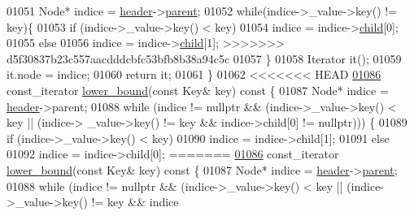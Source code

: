 \begin{DoxyCode}
01051             Node* indice = \hyperlink{classaed2_1_1map_a92d93f905c8ad73fba18fdc7e8915cce_a92d93f905c8ad73fba18fdc7e8915cce}{header}->\hyperlink{structaed2_1_1map_1_1Node_a91a1855da19d22344bc89c2f8b998a7a_a91a1855da19d22344bc89c2f8b998a7a}{parent};
01052         \textcolor{keywordflow}{while}(indice->\_value->key() != key)\{
01053             \textcolor{keywordflow}{if} (indice->\_value->key() < key)
01054                 indice = indice->\hyperlink{structaed2_1_1map_1_1Node_acac3478cefbd8bebe0c3f3abb9a2935e_acac3478cefbd8bebe0c3f3abb9a2935e}{child}[0];
01055             \textcolor{keywordflow}{else}
01056                 indice = indice->\hyperlink{structaed2_1_1map_1_1Node_acac3478cefbd8bebe0c3f3abb9a2935e_acac3478cefbd8bebe0c3f3abb9a2935e}{child}[1];
>>>>>>> d5f30837b23c557aacdddcbfc53bfb8b38a94c5c
01057         \}
01058         Iterator it();
01059         it.node = indice;
01060         \textcolor{keywordflow}{return} it;
01061     \}
01062 
<<<<<<< HEAD
\hypertarget{map2_8h_source_l01086}{}\hyperlink{classaed2_1_1map_a3399d36fdd5a880b494f3a5795d3f18f_a3399d36fdd5a880b494f3a5795d3f18f}{01086}     const\_iterator \hyperlink{classaed2_1_1map_a3399d36fdd5a880b494f3a5795d3f18f_a3399d36fdd5a880b494f3a5795d3f18f}{lower_bound}(\textcolor{keyword}{const} Key& key)\textcolor{keyword}{ const }\{
01087         Node* indice = \hyperlink{classaed2_1_1map_a92d93f905c8ad73fba18fdc7e8915cce_a92d93f905c8ad73fba18fdc7e8915cce}{header}->parent;
01088         \textcolor{keywordflow}{while} (indice != \textcolor{keyword}{nullptr} && (indice->\_value->key() < key || (indice->
      \_value->key() != key && indice->child[0] != \textcolor{keyword}{nullptr}))) \{
01089             \textcolor{keywordflow}{if} (indice->\_value->key() < key)
01090                 indice = indice->child[1];
01091             \textcolor{keywordflow}{else}
01092                 indice = indice->child[0];
=======
\hyperlink{classaed2_1_1map_a62075a47afdf89267c5462f88164af3d_a62075a47afdf89267c5462f88164af3d}{01086}     const\_iterator \hyperlink{classaed2_1_1map_a62075a47afdf89267c5462f88164af3d_a62075a47afdf89267c5462f88164af3d}{lower\_bound}(\textcolor{keyword}{const} Key& key)\textcolor{keyword}{ const }\{
01087         Node* indice = \hyperlink{classaed2_1_1map_a92d93f905c8ad73fba18fdc7e8915cce_a92d93f905c8ad73fba18fdc7e8915cce}{header}->\hyperlink{structaed2_1_1map_1_1Node_a91a1855da19d22344bc89c2f8b998a7a_a91a1855da19d22344bc89c2f8b998a7a}{parent};
01088         \textcolor{keywordflow}{while} (indice != \textcolor{keyword}{nullptr} && (indice->\_value->key() < key || (indice->\_value->key() != key && indice

\end{DoxyCode}
